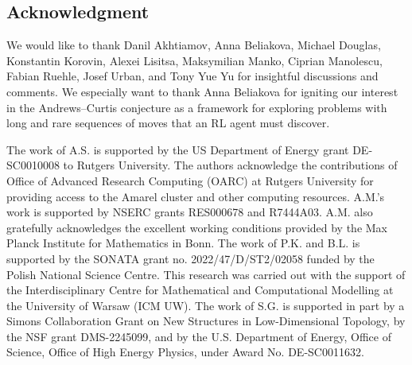 
\subsection*{Acknowledgment}

We would like to thank Danil Akhtiamov, Anna Beliakova, Michael Douglas, Konstantin Korovin, Alexei Lisitsa, Maksymilian Manko, Ciprian Manolescu, Fabian Ruehle, Josef Urban, and Tony Yue Yu for insightful discussions and comments. We especially want to thank Anna Beliakova for igniting our interest in the Andrews--Curtis conjecture as a framework for exploring problems with long and rare sequences of moves that an RL agent must discover.

The work of A.S. is supported by the US Department of Energy grant DE-SC0010008 to Rutgers University. The authors acknowledge the contributions of Office of Advanced Research Computing (OARC) at Rutgers University for providing access to the Amarel cluster and other computing resources.
A.M.'s work is supported by NSERC grants RES000678 and R7444A03. A.M. also gratefully acknowledges the excellent working conditions provided by the Max Planck Institute for Mathematics in Bonn.
The work of P.K. and B.L. is supported by the SONATA grant no. 2022/47/D/ST2/02058 funded by the Polish National Science Centre. This research was carried out with the support of the Interdisciplinary Centre for Mathematical and Computational Modelling at the University of Warsaw (ICM UW).
The work of S.G. is supported in part by a Simons Collaboration Grant on New Structures in Low-Dimensional Topology, by the NSF grant DMS-2245099, and by the U.S. Department of Energy, Office of Science, Office of High Energy Physics, under Award No. DE-SC0011632.